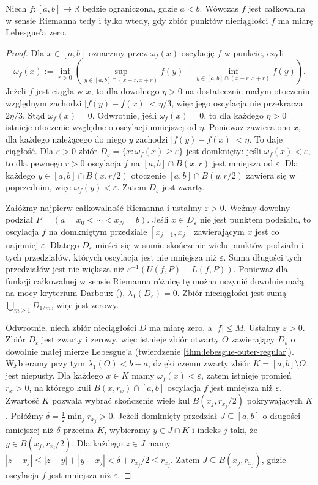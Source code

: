 \begin{twierdzenie}
\label{thm:riemann-criterion}
Niech $f:[a,b]\to\mathbb R$ będzie ograniczona, gdzie
$a<b$. Wówczas $f$ jest całkowalna w sensie Riemanna
tedy i tylko wtedy, gdy zbiór punktów nieciągłości $f$
ma miarę Lebesgue'a zero.
\end{twierdzenie}
\begin{proof}
Dla $x\in[a,b]$ oznaczmy przez $\omega_f(x)$
oscylację $f$ w punkcie, czyli
\[
\omega_f(x):=\inf_{r>0}
\left(\sup_{y\in[a,b]\cap(x-r,x+r)}f(y)
-\inf_{y\in[a,b]\cap(x-r,x+r)}f(y)\right).
\]
Jeżeli $f$ jest ciągła w $x$, to dla dowolnego $\eta>0$ na dostatecznie małym otoczeniu względnym zachodzi $|f(y)-f(x)|<\eta/3$, więc jego oscylacja nie przekracza $2\eta/3$. Stąd $\omega_f(x)=0$. Odwrotnie, jeśli $\omega_f(x)=0$, to dla każdego $\eta>0$ istnieje otoczenie względne o oscylacji mniejszej od $\eta$. Ponieważ zawiera ono $x$, dla każdego należącego do niego $y$ zachodzi $|f(y)-f(x)|<\eta$. To daje ciągłość. Dla $\varepsilon>0$ zbiór
$D_\varepsilon=\{x:\omega_f(x)\ge\varepsilon\}$
jest domknięty: jeśli $\omega_f(x)<\varepsilon$,
to dla pewnego $r>0$ oscylacja $f$ na $[a,b]\cap B(x,r)$ jest mniejsza od $\varepsilon$. Dla każdego $y\in[a,b]\cap B(x,r/2)$ otoczenie $[a,b]\cap B(y,r/2)$ zawiera się w poprzednim, więc $\omega_f(y)<\varepsilon$. Zatem $D_\varepsilon$ jest zwarty.

Załóżmy najpierw całkowalność Riemanna i
ustalmy $\varepsilon>0$. Weźmy dowolny podział
$P=(a=x_0<\cdots<x_N=b)$. Jeśli
$x\in D_\varepsilon$ nie jest punktem podziału,
to oscylacja $f$ na domkniętym przedziale
$[x_{j-1},x_j]$ zawierającym $x$ jest co najmniej
$\varepsilon$. Dlatego $D_\varepsilon$ mieści się
w sumie skończenie wielu punktów podziału i tych
przedziałów, których oscylacja jest nie mniejsza
niż $\varepsilon$. Suma długości tych przedziałów
jest nie większa niż
$\varepsilon^{-1}(U(f,P)-L(f,P))$.
Ponieważ dla funkcji całkowalnej w sensie Riemanna
różnicę tę można uczynić dowolnie małą na mocy kryterium Darboux
(),
$\lambda_1(D_\varepsilon)=0$.
Zbiór nieciągłości jest sumą
$\bigcup_{m\ge1}D_{1/m}$, więc jest zerowy.

Odwrotnie, niech zbiór nieciągłości $D$ ma miarę
zero, a $|f|\le M$. Ustalmy $\varepsilon>0$.
Zbiór $D_\varepsilon$ jest zwarty i zerowy, więc
istnieje zbiór otwarty $O$ zawierający $D_\varepsilon$
o dowolnie małej mierze Lebesgue'a (twierdzenie \ref{thm:lebesgue-outer-regular}). Wybieramy przy tym
$\lambda_1(O)<b-a$, dzięki czemu zwarty zbiór
$K=[a,b]\setminus O$ jest niepusty. Dla każdego
$x\in K$ mamy $\omega_f(x)<\varepsilon$,
zatem istnieje promień $r_x>0$, na którego kuli
$B(x,r_x)\cap[a,b]$ oscylacja $f$ jest
mniejsza niż $\varepsilon$. Zwartość $K$ pozwala
wybrać skończenie wiele kul $B(x_j,r_{x_j}/2)$
pokrywających $K$. Połóżmy
$\delta=\frac12\min_j r_{x_j}>0$.
Jeżeli domknięty przedział $J\subseteq[a,b]$
o długości mniejszej niż $\delta$ przecina $K$,
wybieramy $y\in J\cap K$ i indeks $j$ taki, że
$y\in B(x_j,r_{x_j}/2)$. Dla każdego $z\in J$
mamy
$|z-x_j|\le|z-y|+|y-x_j|<\delta+r_{x_j}/2
\le r_{x_j}$.
Zatem $J\subseteq B(x_j,r_{x_j})$, gdzie
oscylacja $f$ jest mniejsza niż $\varepsilon$.


\end{proof}
